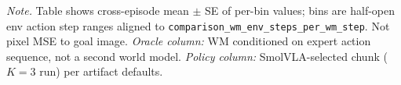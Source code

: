 \begin{minipage}{\linewidth}
\medskip
\noindent\footnotesize\textit{Note.} Table shows cross-episode mean $\pm$ SE of per-bin values; bins are half-open env action step ranges aligned to \texttt{comparison\_wm\_env\_steps\_per\_wm\_step}. Not pixel MSE to goal image.
\noindent\footnotesize\textit{Oracle column:} WM conditioned on expert action sequence, not a second world model.
\noindent\footnotesize\textit{Policy column:} SmolVLA-selected chunk ($K{=}3$ run) per artifact defaults.

\end{minipage}
\par\smallskip
\nopagebreak[4]
